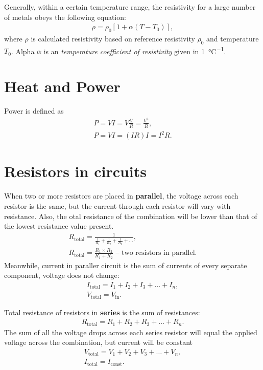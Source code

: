 \documentclass[../../document]{subfiles}
\begin{document}
Generally, within a certain temperature range, the resistivity for a large
number of metals obeys the following equation:
\begin{gather}
	\rho = \rho_0[1+\alpha(T-T_0)],
\end{gather}
where \(\rho\) is calculated resistivity based on reference resistivity
\(\rho_0\) and temperature \(T_0\). Alpha \(\alpha\) is an \emph{temperature
coefficient of resistivity} given in \unit{1\per\celsius}. \cite{practical_electronics}   

\section{Heat and Power}
Power is defined as 
\begin{gather}
	P=VI = V\frac{V}{R} = \frac{V^2}{R},\\
	P=VI=(IR)I=I^2R.
\end{gather}

\section{Resistors in circuits}
When two or more resistors are placed in \textbf{parallel}, the voltage across
each resistor is the same, but the current through each resistor will vary with
resistance. Also, the otal resistance of the combination will be lower than
that of the lowest resistance value present. \cite{practical_electronics}
\begin{gather}
	R_{\text{total}} = \frac{1}{\frac{1}{R_1}+\frac{1}{R_2}+\frac{1}{R_3}+\dots},\\
	R_{\text{total}} = \frac{R_1\times R_2}{R_1+R_2}\text{ -- two resistors in parallel}.
\end{gather}Meanwhile, current in paraller circuit is the sum of currents of every separate
component, voltage does not change:
\begin{gather}
	I_{\text{total}} = I_1+I_2+I_3+\dots+I_n,\\
	V_{\text{total}} = V_{\text{in}}.
\end{gather}

Total resistance of resistors in \textbf{series} is the sum of resistances:
\begin{gather}
	R_{\text{total}}=R_1+R_2+R_3+\dots+R_n.
\end{gather}
The sum of all the voltage drops across each series resistor will equal the
applied voltage across the combination, but current will be constant \cite{practical_electronics}
\begin{gather}
	V_{\text{total}}=V_1+V_2+V_3+\dots+V_n,\\
	I_{\text{total}} = I_{\text{const}}.
\end{gather}
\end{document}
